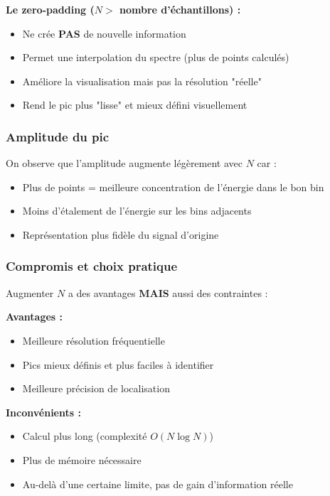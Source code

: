 \documentclass[12pt,a4paper]{article}
\begin{document}
\textbf{Le zero-padding ($N >$ nombre d'échantillons) :}
\begin{itemize}
    \item Ne crée \textbf{PAS} de nouvelle information
    \item Permet une interpolation du spectre (plus de points calculés)
    \item Améliore la visualisation mais pas la résolution "réelle"
    \item Rend le pic plus "lisse" et mieux défini visuellement
\end{itemize}

\subsubsection{Amplitude du pic}

On observe que l'amplitude augmente légèrement avec $N$ car :
\begin{itemize}
    \item Plus de points = meilleure concentration de l'énergie dans le bon bin
    \item Moins d'étalement de l'énergie sur les bins adjacents
    \item Représentation plus fidèle du signal d'origine
\end{itemize}

\subsubsection{Compromis et choix pratique}

Augmenter $N$ a des avantages \textbf{MAIS} aussi des contraintes :

\textbf{Avantages :}
\begin{itemize}
    \item[$\checkmark$] Meilleure résolution fréquentielle
    \item[$\checkmark$] Pics mieux définis et plus faciles à identifier
    \item[$\checkmark$] Meilleure précision de localisation
\end{itemize}

\textbf{Inconvénients :}
\begin{itemize}
    \item[$\times$] Calcul plus long (complexité $O(N \log N)$)
    \item[$\times$] Plus de mémoire nécessaire
    \item[$\times$] Au-delà d'une certaine limite, pas de gain d'information réelle
\end{itemize}
\end{document}
